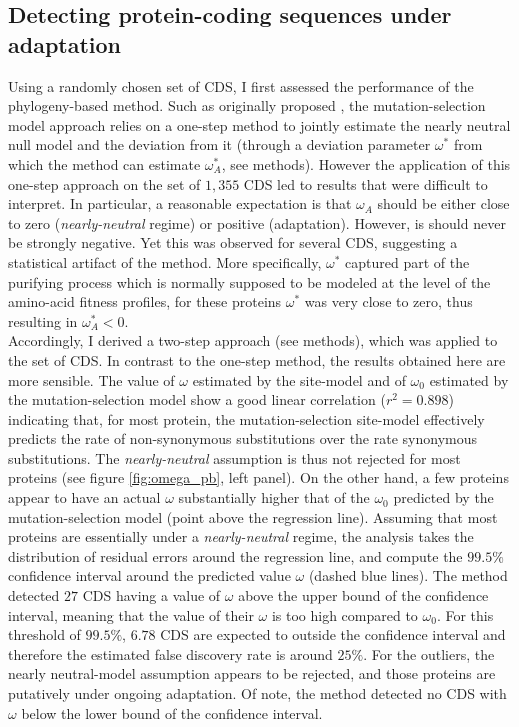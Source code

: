 \documentclass[10pt]{article}
\begin{document}
\begin{multicols}{2}
	\subsection*{Detecting protein-coding sequences under adaptation}
	Using a randomly chosen set of CDS, I first assessed the performance of the phylogeny-based method. Such as originally proposed \cite{Rodrigue2016}, the mutation-selection model approach relies on a one-step method to jointly estimate the nearly neutral null model and the deviation from it (through a deviation parameter $\omega^*$ from which the method can estimate $\omega_A^*$, see methods). However the application of this one-step approach on the set of $1,355$ CDS led to results that were difficult to interpret. In particular, a reasonable expectation is that $\omega_A$ should be either close to zero (\textit{nearly-neutral} regime) or positive (adaptation). However, is should never be strongly negative. Yet this was observed for several CDS, suggesting a statistical artifact of the method. More specifically, $\omega^*$ captured part of the purifying process which is normally supposed to be modeled at the level of the amino-acid fitness profiles, for these proteins $\omega^*$ was very close to zero, thus resulting in $\omega_A^*<0$.  \\
	
	Accordingly, I derived a two-step approach (see methods), which was applied to the set of CDS. In contrast to the one-step method, the results obtained here are more sensible. The value of $\omega$ estimated by the site-model and of $\omega_{0}$ estimated by the mutation-selection model show a good linear correlation ($r^2=0.898$) indicating that, for most protein, the mutation-selection site-model effectively predicts the rate of non-synonymous substitutions over the rate synonymous substitutions. The \textit{nearly-neutral} assumption is thus not rejected for most proteins (see figure \ref{fig:omega_pb}, left panel).
	On the other hand, a few proteins appear to have an actual $\omega$ substantially higher that of the $\omega_0$ predicted by the mutation-selection model (point above the regression line). Assuming that most proteins are essentially under a \textit{nearly-neutral} regime, the analysis takes the distribution of residual errors around the regression line, and compute the $99.5\%$ confidence interval around the predicted value $\omega$ (dashed blue lines).  The method detected $27$ CDS having a value of $\omega$ above the upper bound of the confidence interval, meaning that the value of their $\omega$ is too high compared to $\omega_{0}$. For this threshold of $99.5\%$, $6.78$ CDS are expected to outside the confidence interval and therefore the estimated false discovery rate is around $25 \%$. For the outliers, the nearly neutral-model assumption appears to be rejected, and those proteins are putatively under ongoing adaptation. Of note, the method detected no CDS with $\omega$ below the lower bound of the confidence interval. \\
	

\end{multicols}
\end{document}
